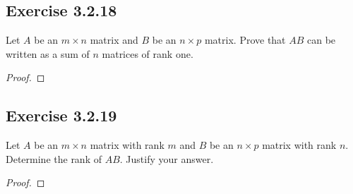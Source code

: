 \subsection*{Exercise 3.2.18} Let \( A  \) be an \( m \times n  \) matrix and \( B  \) be an \( n \times p  \) matrix. Prove that \( AB  \) can be written as a sum of \( n  \) matrices of rank one.
\begin{proof}

\end{proof}

\subsection*{Exercise 3.2.19} Let \( A  \) be an \( m \times n  \) matrix with rank \(  m  \) and \( B  \) be an \( n \times p  \) matrix with rank \( n  \). Determine the rank of \( AB  \). Justify your answer.
\begin{proof}

\end{proof}
